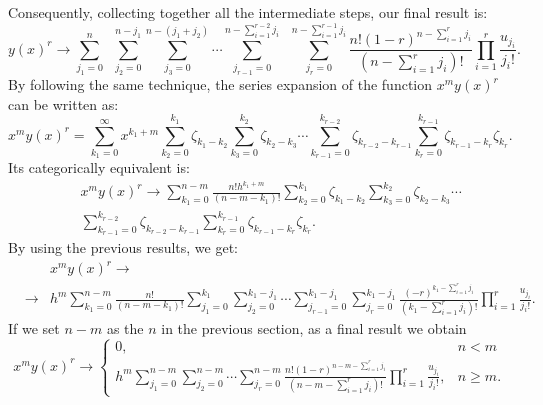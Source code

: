 \documentclass[10pt]{amsart}
\numberwithin{equation}{section}
\theoremstyle{definition}
\begin{document}
Consequently, collecting together all the intermediate steps, our final
result is:
\begin{equation}
y(x)^{r}\to \sum _{j_{1}=0}^{n}\;\; \sum _{j_{2}=0}^{n-j_1}\sum _{j_{3}=0}^{n-(j_1+j_2)} \cdots \sum _{j_{r-1}=0}^{n-\sum _{i=1}^{r-2}j_{i}}\;\;\sum _{j_{r}=0}^{n-\sum _{i=1}^{r-1}j_{i}}
\frac{n!(1-r)^{n-\sum _{i=1}^{r}j_{i}}}{(n-\sum _{i=1}^{r}j_{i})!}
\prod _{i=1}^{r} \frac{u_{j_{i}}}{j_{i}!}.
\label{eqC.17}
\end{equation}
By following the same technique, the series expansion of the function
$x^{m}y(x)^{r}$ can be written as:
\begin{equation}
x^{m}y(x)^{r}=\sum _{k_{1}=0}^{\infty}x^{k_{1}+m}\sum _{k_{2}=0}^{k_{1}}
\zeta _{k_{1}-k_{2}} \sum _{k_{3}=0}^{k_{2}}\zeta _{k_{2}-k_{3}}
\cdots \sum _{k_{r-1}=0}^{k_{r-2}}\zeta _{k_{r-2}-k_{r-1}}\sum _{k_{r}=0}^{k_{r-1}}
\zeta _{k_{r-1}-k_{r}}\zeta _{k_{r}}.
\label{eqC.18}
\end{equation}
Its categorically equivalent is:
\begin{eqnarray}
&&x^{m} y(x)^{r}\to \sum _{k_{1}=0}^{n-m}
\frac{n!h^{k_{1}+m}}{(n-m-k_{1})!}\sum _{k_{2}=0}^{k_{1}}\zeta _{k_{1}-k_{2}}
\sum _{k_{3}=0}^{k_{2}}\zeta _{k_{2}-k_{3}}\cdots
\label{eqC.19}
\\
&&\sum _{k_{r-1}=0}^{k_{r-2}}\zeta _{k_{r-2}-k_{r-1}}\sum _{k_{r}=0}^{k_{r-1}}
\zeta _{k_{r-1}-k_{r}}\zeta _{k_{r}}.
\nonumber
\end{eqnarray}
By using the previous results, we get:
\begin{eqnarray}
&&x^{m} y(x)^{r}\to
\label{eqC.20}
\\
&\to & h^{m} \sum _{k_{1}=0}^{n-m}\frac{n!}{(n-m-k_{1})!} \sum _{j_{1}=0}^{k_{1}}
\sum _{j_{2}=0}^{k_{1}-j_{1}} \cdots \sum _{j_{r-1}=0}^{k_{1}-j_{1}}
\sum _{j_{r}=0}^{k_{1}-j_{1}}
\frac{(-r)^{k_{1}-\sum _{i=1}^{r}j_{i}}}{( k_{1}-\sum _{i=1}^{r}j_{i})!}
\prod _{i=1}^{r} \frac{u_{j_{i}}}{j_{i}!}.
\nonumber
\end{eqnarray}
If we set $n-m$ as the $n$ in the previous section, as a final result we
obtain
\begin{equation}
x^{m}y(x)^{r}\to
\begin{cases}
0, & n< m
\\[8pt]
\displaystyle{ h^{m} \sum _{j_{1}=0}^{n-m} \sum _{j_{2}=0}^{n-m}
\cdots \sum _{j_{r}=0}^{n-m}
\frac{n!(1-r)^{n-m-\sum _{i=1}^{r}j_{i}}}{(n-m-\sum _{i=1}^{r}j_{i})!}
\prod _{i=1}^{r} \frac{u_{j_{i}}}{j_{i}!}},& n\ge m .
\end{cases}
\label{eqC.21}
\end{equation}
\end{document}
